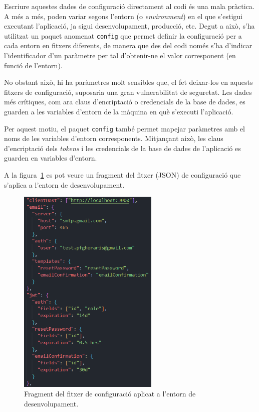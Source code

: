 \documentclass[a4paper,12pt]{ThesisStyle}
\begin{document}
Escriure aquestes dades de configuració directament al codi és una mala pràctica. A més a més, poden variar segons l'entorn (o \textit{environment}) en el que s'estigui executant l'aplicació, ja sigui desenvolupament, producció, etc. Degut a això, s'ha utilitzat un paquet anomenat \texttt{config} que permet definir la configuració per a cada entorn en fitxers diferents, de manera que des del codi només s'ha d'indicar l'identificador d'un paràmetre per tal d'obtenir-ne el valor corresponent (en funció de l'entorn).

No obstant això, hi ha paràmetres molt sensibles que, el fet deixar-los en aquests fitxers de configuració, suposaria una gran vulnerabilitat de seguretat. Les dades més crítiques, com ara claus d'encriptació o credencials de la base de dades, es guarden a les variables d'entorn de la màquina en què s'executi l'aplicació.

Per aquest motiu, el paquet \texttt{config} també permet mapejar paràmetres amb el noms de les variables d'entorn corresponents. Mitjançant això, les claus d'encriptació dels \textit{tokens} i les credencials de la base de dades de l'aplicació es guarden en variables d'entorn.

A la figura~\ref{img:devConfig} es pot veure un fragment del fitxer (JSON) de configuració que s'aplica a l'entorn de desenvolupament.

\begin{figure}[H]
  \centering
  \includegraphics[width=0.6\textwidth]{assets/code/config/devConfig.png}
  \caption{\label{img:devConfig}Fragment del fitxer de configuració aplicat a l'entorn de desenvolupament.}
\end{figure}
\end{document}
